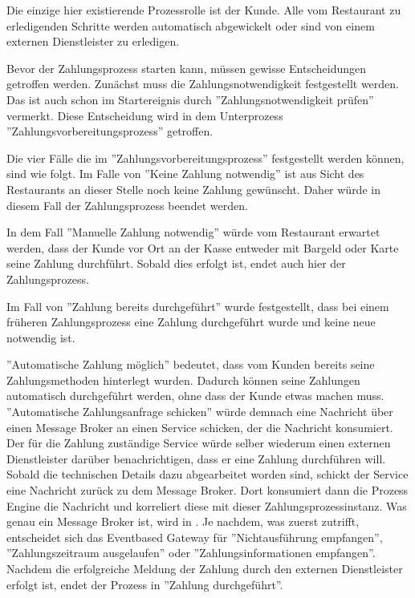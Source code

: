 Die einzige hier existierende Prozessrolle ist der Kunde. Alle vom Restaurant zu erledigenden Schritte werden automatisch abgewickelt oder sind von einem externen Dienstleister zu erledigen.



Bevor der Zahlungsprozess starten kann, müssen gewisse Entscheidungen getroffen werden. Zunächst muss die Zahlungsnotwendigkeit festgestellt werden. Das ist auch schon im Startereignis durch ''Zahlungsnotwendigkeit prüfen'' vermerkt. Diese Entscheidung wird in dem Unterprozess ''Zahlungsvorbereitungsprozess'' getroffen.

Die vier Fälle die im ''Zahlungsvorbereitungsprozess'' festgestellt werden können, sind wie folgt. Im Falle von ''Keine Zahlung notwendig'' ist aus Sicht des Restaurants an dieser Stelle noch keine Zahlung  gewünscht. Daher würde in diesem Fall der Zahlungsprozess beendet werden.

In dem Fall ''Manuelle Zahlung notwendig'' würde vom Restaurant erwartet werden, dass der Kunde vor Ort an der Kasse entweder mit Bargeld oder Karte seine Zahlung durchführt. Sobald dies erfolgt ist, endet auch hier der Zahlungsprozess.

Im Fall von ''Zahlung bereits durchgeführt'' wurde festgestellt, dass bei einem früheren Zahlungsprozess eine Zahlung durchgeführt wurde und keine neue notwendig ist.

''Automatische Zahlung möglich'' bedeutet, dass vom Kunden bereits seine Zahlungsmethoden hinterlegt wurden. Dadurch können seine Zahlungen automatisch durchgeführt werden, ohne dass der Kunde etwas machen muss. ''Automatische Zahlungsanfrage schicken'' würde demnach eine Nachricht über einen Message Broker an einen Service schicken, der die Nachricht konsumiert. Der für die Zahlung zuständige Service würde selber wiederum einen externen Dienstleister darüber benachrichtigen, dass er eine Zahlung durchführen will. Sobald die technischen Details dazu abgearbeitet worden sind, schickt der Service eine Nachricht zurück zu dem Message Broker. Dort konsumiert dann die Prozess Engine die Nachricht und korreliert diese mit dieser Zahlungsprozessinstanz. Was genau ein Message Broker ist, wird in  . Je nachdem, was zuerst zutrifft, entscheidet sich das Eventbased Gateway für ''Nichtausführung empfangen'', ''Zahlungszeitraum ausgelaufen'' oder ''Zahlungsinformationen empfangen''.  Nachdem die erfolgreiche Meldung der Zahlung durch den externen Dienstleister erfolgt ist, endet der Prozess in ''Zahlung durchgeführt''.

